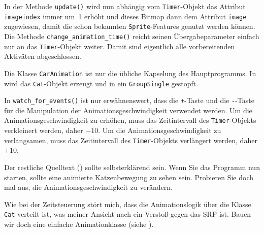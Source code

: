 In der Methode \texttt{update()} wird nun abhängig vom \texttt{Timer}-Objekt das Attribut \texttt{imageindex} immer um~1 erhöht und dieses Bitmap dann dem Attribut \texttt{image} zugewiesen, damit die schon bekannten \texttt{Sprite}-Features genutzt werden können. Die Methode \texttt{change\_\-ani\-ma\-tion\_\-time()} reicht seinen Übergabeparameter einfach nur an das \texttt{Timer}-Objekt weiter. Damit sind eigentlich alle vorbereitenden Aktiväten abgeschlossen.


Die Klasse \texttt{CarAnimation} ist nur die übliche Kapselung des Hauptprogramms. In  wird das \texttt{Cat}-Objekt erzeugt und in ein \texttt{GroupSingle} gestopft.


In \texttt{watch\_for\_events()} ist nur erwähnenswert, dass die \texttt{+}-Taste und die \texttt{-}-Taste für die Manipulation der Animationsgeschwindigkeit verwendet werden. Um die Animationsgeschwindigkeit zu erhöhen, muss das Zeitintervall des \texttt{Timer}-Objekts verkleinert werden, daher $-10$. Um die Animationsgeschwindigkeit zu verlangsamen, muss das Zeitintervall des \texttt{Timer}-Objekts verlängert werden, daher $+10$. 


Der restliche Quelltext () sollte selbsterklärend sein. Wenn Sie das Programm nun starten, sollte eine animierte Katzenbewegung zu sehen sein. Probieren Sie doch mal aus, die Animationsgeschwindigkeit zu verändern. 


Wie bei der Zeitsteuerung stört mich, dass die Animationslogik über die Klasse \texttt{Cat} verteilt ist, was meiner Ansicht nach ein Verstoß gegen das SRP ist. Bauen wir doch eine einfache Animationklasse (siehe ).

